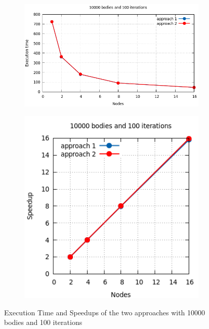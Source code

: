\documentclass[a4paper]{article}
\begin{document}
\begin{figure}[ht]
\begin{subfigure}{.55\textwidth}
  \centering
  \includegraphics[width=1\linewidth]{results/10000_100_app}
\end{subfigure} %
\begin{subfigure}{.35\textwidth}
  \centering
  \includegraphics[width=1\linewidth]{results/10000_100_app_sp}
\end{subfigure}
  \caption{Execution Time and Speedups of the two approaches with 10000 bodies and 100 iterations}
  \label{fig:G2}
\end{figure}
\FloatBarrier
\end{document}
